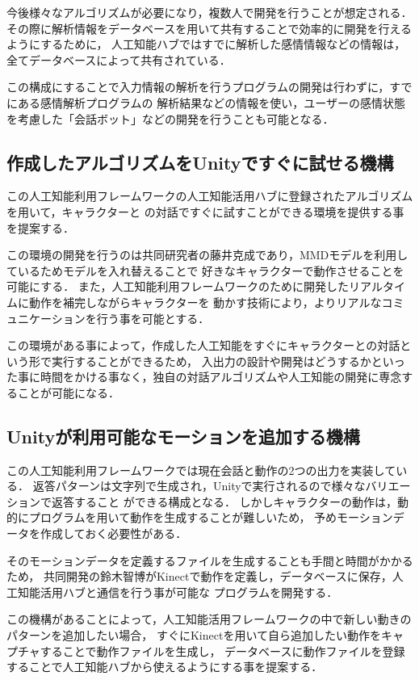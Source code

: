 今後様々なアルゴリズムが必要になり，複数人で開発を行うことが想定される．
その際に解析情報をデータベースを用いて共有することで効率的に開発を行えるようにするために，
人工知能ハブではすでに解析した感情情報などの情報は，全てデータベースによって共有されている．

この構成にすることで入力情報の解析を行うプログラムの開発は行わずに，すでにある感情解析プログラムの
解析結果などの情報を使い，ユーザーの感情状態を考慮した「会話ボット」などの開発を行うことも可能となる．
\subsection{作成したアルゴリズムをUnityですぐに試せる機構}
この人工知能利用フレームワークの人工知能活用ハブに登録されたアルゴリズムを用いて，キャラクターと
の対話ですぐに試すことができる環境を提供する事を提案する．

この環境の開発を行うのは共同研究者の藤井克成であり，MMDモデルを利用しているためモデルを入れ替えることで
好きなキャラクターで動作させることを可能にする．
また，人工知能利用フレームワークのために開発したリアルタイムに動作を補完しながらキャラクターを
動かす技術により，よりリアルなコミュニケーションを行う事を可能とする．

この環境がある事によって，作成した人工知能をすぐにキャラクターとの対話という形で実行することができるため，
入出力の設計や開発はどうするかといった事に時間をかける事なく，独自の対話アルゴリズムや人工知能の開発に専念することが可能になる．
\subsection{Unityが利用可能なモーションを追加する機構}
この人工知能利用フレームワークでは現在会話と動作の2つの出力を実装している．
返答パターンは文字列で生成され，Unityで実行されるので様々なバリエーションで返答すること
ができる構成となる．
しかしキャラクターの動作は，動的にプログラムを用いて動作を生成することが難しいため，
予めモーションデータを作成しておく必要性がある．

そのモーションデータを定義するファイルを生成することも手間と時間がかかるため，
共同開発の鈴木智博がKinectで動作を定義し，データベースに保存，人工知能活用ハブと通信を行う事が可能な
プログラムを開発する\cite{suzuki}．

この機構があることによって，人工知能活用フレームワークの中で新しい動きのパターンを追加したい場合，
すぐにKinectを用いて自ら追加したい動作をキャプチャすることで動作ファイルを生成し，
データベースに動作ファイルを登録することで人工知能ハブから使えるようにする事を提案する．